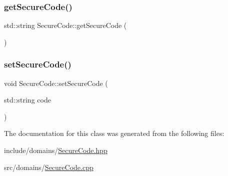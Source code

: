 \subsubsection{\texorpdfstring{getSecureCode()}{getSecureCode()}}
{\footnotesize\ttfamily std\+::string Secure\+Code\+::get\+Secure\+Code (\begin{DoxyParamCaption}{ }\end{DoxyParamCaption})}

\mbox{\label{class_secure_code_a7417a7fff51641cd8e5f829af6af7eea}} 
\subsubsection{\texorpdfstring{setSecureCode()}{setSecureCode()}}
{\footnotesize\ttfamily void Secure\+Code\+::set\+Secure\+Code (\begin{DoxyParamCaption}\item[{std\+::string}]{code }\end{DoxyParamCaption})}



The documentation for this class was generated from the following files\+:\begin{DoxyCompactItemize}
\item 
include/domains/\mbox{\hyperlink{_secure_code_8hpp}{Secure\+Code.\+hpp}}\item 
src/domains/\mbox{\hyperlink{_secure_code_8cpp}{Secure\+Code.\+cpp}}\end{DoxyCompactItemize}
